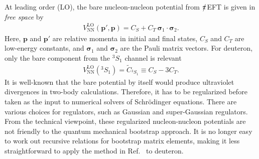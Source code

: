 \documentclass[aps,prc,reprint,superscriptaddress,nofootinbib]{revtex4-2}
\begin{document}
At leading order (LO), the bare nucleon-nucleon potential from $\slashed{\pi}$EFT is given in \emph{free space} by
\begin{align}
V_\text{NN}^\text{LO}(\bm{p}',\bm{p})=C_S+C_T\,\bm{\sigma}_1\cdot\bm{\sigma}_2.
\end{align}
Here, $\bm{p}$ and $\bm{p}'$ are relative momenta in initial and final states,
$C_S$ and $C_T$ are low-energy constants, and $\bm{\sigma}_1$ and $\bm{\sigma}_2$ are the Pauli matrix vectors.
For deuteron, only the bare component from the ${}^{3}S_{1}$ channel is relevant
\begin{align}
V_\text{NN}^\text{LO}({}^{3}{S}_1)=\widetilde{C}_{{}^{3}S_1}\equiv C_S-3C_T.
\end{align}
It is well-known that the bare potential by itself would produce ultraviolet divergences in two-body calculations.
Therefore, it has to be regularized before taken as the input to numerical solvers of Schr\"odinger equations.
There are various choices for regulators, such as Gaussian and super-Gaussian regulators.
From the technical viewpoint, these regularized nucleon-nucleon potentials are not friendly to the quantum mechanical bootstrap approach.
It is no longer easy to work out recursive relations for bootstrap matrix elements,
making it less straightforward to apply the method in Ref.~\cite{Han:2020bkb} to deuteron.
\end{document}
